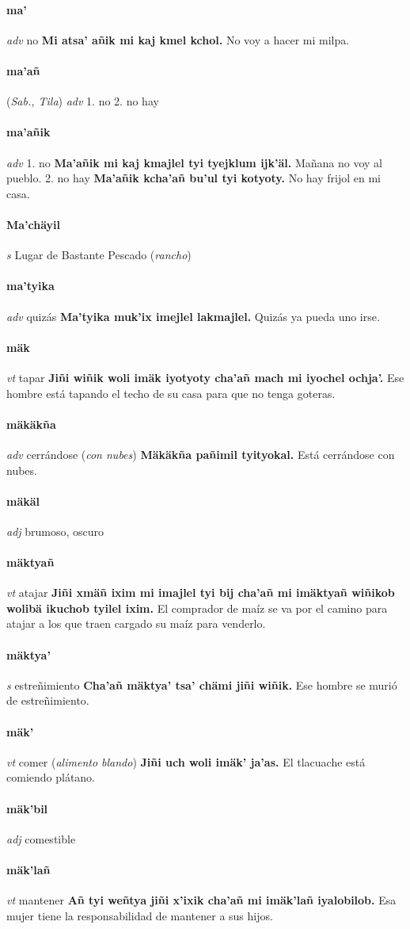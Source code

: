 \documentclass{scrbook}
\newcommand{\entry}[1]{\paragraph{#1}}
\newcommand{\onedefinition}[1]{#1.}
\newcommand{\partofspeech}[1]{\textit{#1}}
\newcommand{\spanishtranslation}[1]{#1}
\newcommand{\clarification}[1]{(\textit{#1})}
\newcommand{\cholexample}[1]{\textbf{#1}}
\newcommand{\exampletranslation}[1]{#1}
\newcommand{\relevantdialect}[1]{(\textit{#1})}
\begin{document}
\begin{multicols}{2}
\entry{ma'}
\partofspeech{adv}
\spanishtranslation{no}
\cholexample{Mi atsa' añik mi kaj kmel kchol.}
\exampletranslation{No voy a hacer mi milpa.}

\entry{ma'añ}
\relevantdialect{Sab., Tila}
\partofspeech{adv}
\onedefinition{1}
\spanishtranslation{no}
\onedefinition{2}
\spanishtranslation{no hay}

\entry{ma'añik}
\partofspeech{adv}
\onedefinition{1}
\spanishtranslation{no}
\cholexample{Ma'añik mi kaj kmajlel tyi tyejklum ijk'äl.}
\exampletranslation{Mañana no voy al pueblo.}
\onedefinition{2}
\spanishtranslation{no hay}
\cholexample{Ma'añik kcha'añ bu'ul tyi kotyoty.}
\exampletranslation{No hay frijol en mi casa.}

\entry{Ma'chäyil}
\partofspeech{s}
\spanishtranslation{Lugar de Bastante Pescado}
\clarification{rancho}

\entry{ma'tyika}
\partofspeech{adv}
\spanishtranslation{quizás}
\cholexample{Ma'tyika muk'ix imejlel lakmajlel.}
\exampletranslation{Quizás ya pueda uno irse.}

\entry{mäk}
\partofspeech{vt}
\spanishtranslation{tapar}
\cholexample{Jiñi wiñik woli imäk iyotyoty cha'añ mach mi iyochel ochja'.}
\exampletranslation{Ese hombre está tapando el techo de su casa para que no tenga goteras.}

\entry{mäkäkña}
\partofspeech{adv}
\spanishtranslation{cerrándose}
\clarification{con nubes}
\cholexample{Mäkäkña pañimil tyityokal.}
\exampletranslation{Está cerrándose con nubes.}

\entry{mäkäl}
\partofspeech{adj}
\spanishtranslation{brumoso, oscuro}

\entry{mäktyañ}
\partofspeech{vt}
\spanishtranslation{atajar}
\cholexample{Jiñi xmäñ ixim mi imajlel tyi bij cha'añ mi imäktyañ wiñikob wolibä ikuchob tyilel ixim.}
\exampletranslation{El comprador de maíz se va por el camino para atajar a los que traen cargado su maíz para venderlo.}

\entry{mäktya'}
\partofspeech{s}
\spanishtranslation{estreñimiento}
\cholexample{Cha'añ mäktya' tsa' chämi jiñi wiñik.}
\exampletranslation{Ese hombre se murió de estreñimiento.}

\entry{mäk'}
\partofspeech{vt}
\spanishtranslation{comer}
\clarification{alimento blando}
\cholexample{Jiñi uch woli imäk' ja'as.}
\exampletranslation{El tlacuache está comiendo plátano.}

\entry{mäk'bil}
\partofspeech{adj}
\spanishtranslation{comestible}

\entry{mäk'lañ}
\partofspeech{vt}
\spanishtranslation{mantener}
\cholexample{Añ tyi weñtya jiñi x'ixik cha'añ mi imäk'lañ iyalobilob.}
\exampletranslation{Esa mujer tiene la responsabilidad de mantener a sus hijos.}


\end{multicols}
\end{document}
